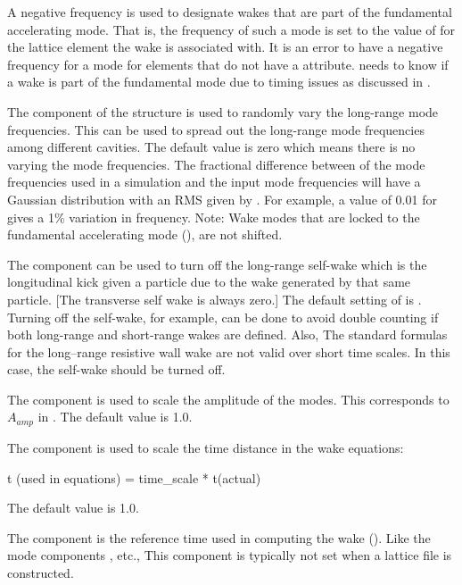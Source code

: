 A negative frequency is used to designate wakes that are part of the fundamental accelerating
mode. That is, the frequency of such a mode is set to the value of  for the lattice
element the wake is associated with. It is an error to have a negative frequency for a mode for
elements that do not have a  attribute. \bmad needs to know if a wake is part of
the fundamental mode due to timing issues as discussed in .

The  component of the  structure is used to randomly vary the long-range
mode frequencies. This can be used to spread out the long-range mode frequencies among different
cavities. The default value is zero which means there is no varying the mode frequencies. The
fractional difference between of the mode frequencies used in a simulation and the input mode
frequencies will have a Gaussian distribution with an RMS given by . For example, a
value of 0.01 for  gives a 1\% variation in frequency. Note: Wake modes that are
locked to the fundamental accelerating mode (), are not shifted.

The  component can be used to turn off the long-range self-wake
which is the longitudinal kick given a particle due to the wake generated by that same
particle. [The transverse self wake is always zero.] The default setting of  is
. Turning off the self-wake, for example, can be done to avoid double counting if both
long-range and short-range wakes are defined. Also, The standard formulas for the long--range
resistive wall wake are not valid over short time scales. In this case, the self-wake should be
turned off.

The  component is used to scale the amplitude of the modes. This corresponds to $A_{amp}$
in . The default value is 1.0.

The  component  is used to scale the time distance in the wake equations:
\begin{example}
  t (used in equations) = time_scale * t(actual)
\end{example}
The default value is 1.0.

The  component is the reference time used in computing the wake (). Like the mode
components , etc., This component is typically not set when a lattice file is
constructed.

